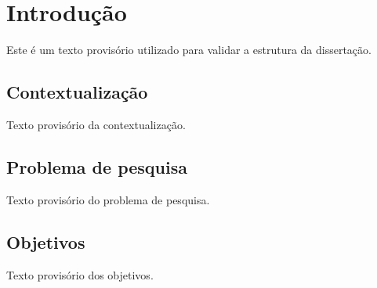 \chapter{Introdução}

Este é um texto provisório utilizado para validar a estrutura da dissertação.

\section{Contextualização}

Texto provisório da contextualização.

\section{Problema de pesquisa}

Texto provisório do problema de pesquisa.

\section{Objetivos}

Texto provisório dos objetivos.
